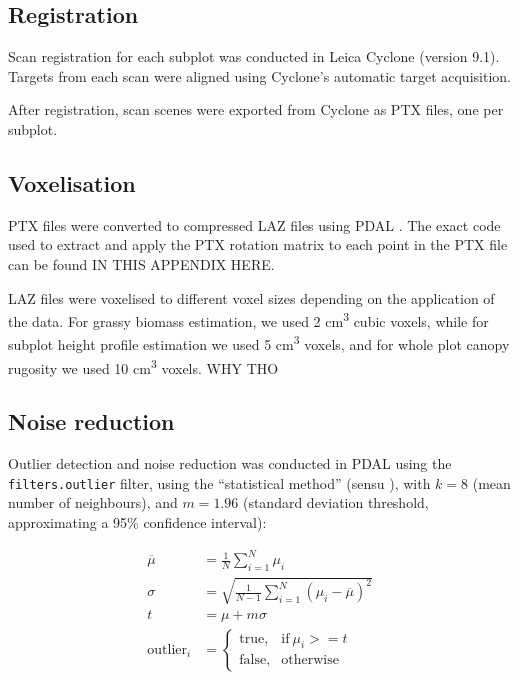 \documentclass[11pt,a4paper]{article}
\begin{document}
\subsection{Registration}

Scan registration for each subplot was conducted in Leica Cyclone (version 9.1). Targets from each scan were aligned using Cyclone's automatic target acquisition. 

After registration, scan scenes were exported from Cyclone as PTX files, one per subplot.

\subsection{Voxelisation}

PTX files were converted to compressed LAZ files using PDAL \citep{}. The exact code used to extract and apply the PTX rotation matrix to each point in the PTX file can be found IN THIS APPENDIX HERE. 

LAZ files were voxelised to different voxel sizes depending on the application of the data. For grassy biomass estimation, we used 2 cm\textsuperscript{3} cubic voxels, while for subplot height profile estimation we used 5 cm\textsuperscript{3} voxels, and for whole plot canopy rugosity we used 10 cm\textsuperscript{3} voxels. WHY THO

\subsection{Noise reduction}

Outlier detection and noise reduction was conducted in PDAL using the \texttt{filters.outlier} filter, using the ``statistical method'' (sensu \citealt{Rusu2008}), with $k = 8$ (mean number of neighbours), and $m = 1.96$ (standard deviation threshold, approximating a 95\% confidence interval):

\begin{align}
	\overline{\mu} &= \frac{1}{N} \sum_{i=1}^{N} \mu_{i} \\
	\sigma &= \sqrt{\frac{1}{N-1} \sum_{i=1}^{N}(\mu_{i} - \overline{\mu{}})^2} \\
	t &= \mu + m \sigma \\
	\text{outlier}_{i} &= 
		\begin{cases}
			\text{true}, & \text{if}\ \mu_{i} >= t \\
			\text{false}, & \text{otherwise}
		\end{cases}
\end{align}
\end{document}
